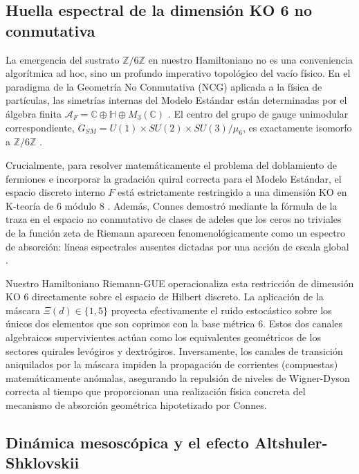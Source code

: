 \documentclass[aps,prl,preprint,superscriptaddress,floatfix]{revtex4-2}
\begin{document}
\subsection{Huella espectral de la dimensión KO 6 no conmutativa}

La emergencia del sustrato $\mathbb{Z}/6\mathbb{Z}$ en nuestro Hamiltoniano no es una conveniencia algorítmica ad hoc, sino un profundo imperativo topológico del vacío físico. En el paradigma de la Geometría No Conmutativa (NCG) aplicada a la física de partículas, las simetrías internas del Modelo Estándar están determinadas por el álgebra finita $\mathcal{A}_F = \mathbb{C} \oplus \mathbb{H} \oplus M_3(\mathbb{C})$ \cite{Chamseddine2007, Connes2008}. El centro del grupo de gauge unimodular correspondiente, $G_{SM} = U(1) \times SU(2) \times SU(3) / \mu_6$, es exactamente isomorfo a $\mathbb{Z}/6\mathbb{Z}$ \cite{Connes2008}.

Crucialmente, para resolver matemáticamente el problema del doblamiento de fermiones e incorporar la gradación quiral correcta para el Modelo Estándar, el espacio discreto interno $F$ está estrictamente restringido a una dimensión KO en K-teoría de 6 módulo 8 \cite{Connes2008}. Además, Connes demostró mediante la fórmula de la traza en el espacio no conmutativo de clases de adeles que los ceros no triviales de la función zeta de Riemann aparecen fenomenológicamente como un espectro de absorción: líneas espectrales ausentes dictadas por una acción de escala global \cite{Connes1999}.

Nuestro Hamiltoniano Riemann-GUE operacionaliza esta restricción de dimensión KO 6 directamente sobre el espacio de Hilbert discreto. La aplicación de la máscara $\Xi(d) \in \{1,5\}$ proyecta efectivamente el ruido estocástico sobre los únicos dos elementos que son coprimos con la base métrica 6. Estos dos canales algebraicos supervivientes actúan como los equivalentes geométricos de los sectores quirales levógiros y dextrógiros. Inversamente, los canales de transición aniquilados por la máscara impiden la propagación de corrientes (compuestas) matemáticamente anómalas, asegurando la repulsión de niveles de Wigner-Dyson correcta al tiempo que proporcionan una realización física concreta del mecanismo de absorción geométrica hipotetizado por Connes.

\subsection{Dinámica mesoscópica y el efecto Altshuler-Shklovskii}
\end{document}
